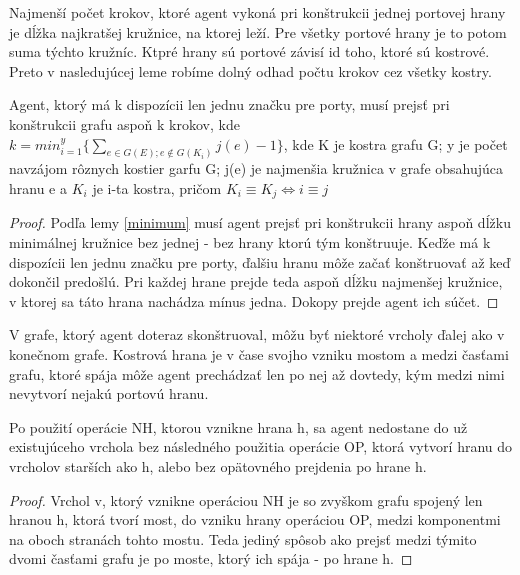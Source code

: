 Najmenší počet krokov, ktoré agent vykoná pri konštrukcii jednej
portovej hrany je dĺžka najkratšej kružnice, na ktorej leží. Pre všetky
portové hrany je to potom suma týchto kružníc. Ktpré hrany sú portové závisí
id toho, ktoré sú kostrové. Preto v nasledujúcej leme robíme dolný odhad
počtu krokov cez všetky kostry.

\begin{lem}
Agent, ktorý má k dispozícii len jednu značku pre porty, 
musí prejsť pri konštrukcii grafu aspoň k krokov, kde 
$k =min_{i=1}^{y}\{\sum_{e \in G(E); e \notin G(K_{i})} j(e)-1  \}$, 
kde K je kostra grafu G; y je počet navzájom rôznych kostier garfu G; j(e) je najmenšia kružnica v
grafe obsahujúca hranu e a $K_{i}$ je i-ta kostra, pričom $K_{i} \equiv K_{j}
\iff i \equiv j$
\end{lem}
\begin{proof}
Podľa lemy \ref{minimum} musí agent prejsť pri konštrukcii hrany aspoň dĺžku
minimálnej kružnice bez jednej - bez hrany ktorú tým konštruuje. Keďže má k
dispozícii len jednu značku pre porty, ďalšiu hranu môže začať konštruovať
až keď dokončil predošlú. Pri každej hrane prejde teda aspoň dĺžku
najmenšej kružnice, v ktorej sa táto hrana nachádza mínus jedna. Dokopy
prejde agent ich súčet.
\end{proof}

V grafe, ktorý agent doteraz skonštruoval, môžu byť niektoré vrcholy ďalej
ako v konečnom grafe. Kostrová hrana je v čase svojho vzniku mostom a medzi
časťami grafu, ktoré spája môže agent prechádzať len po nej až dovtedy, kým
medzi nimi nevytvorí nejakú portovú hranu. 

\begin{lem}
Po použití operácie NH, ktorou vznikne hrana h, sa agent nedostane do
už existujúceho vrchola bez následného použitia
operácie OP, ktorá vytvorí hranu do vrcholov starších ako h,
alebo bez opätovného prejdenia po hrane h.
\end{lem}
\begin{proof}
Vrchol v, ktorý vznikne operáciou NH je so zvyškom grafu spojený len hranou
h, ktorá tvorí most, do vzniku hrany operáciou OP, medzi komponentmi na oboch
stranách tohto mostu. Teda jediný spôsob ako prejsť medzi týmito dvomi
časťami grafu je po moste, ktorý ich spája - po hrane h.
\end{proof}

